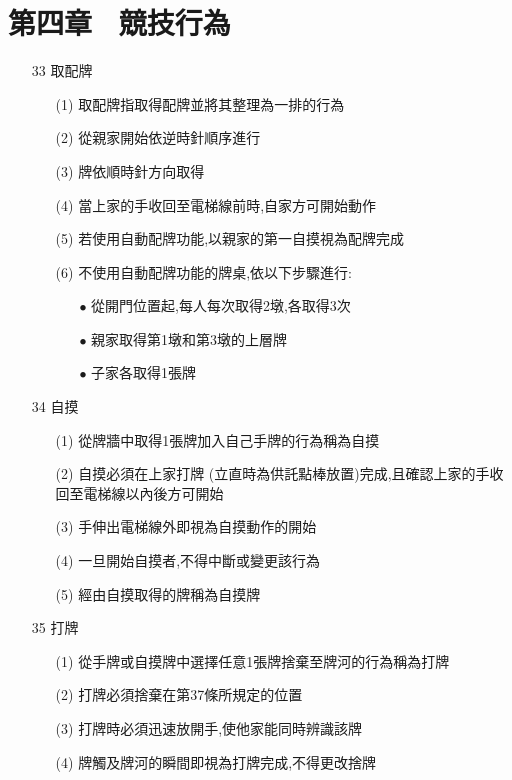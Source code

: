 \documentclass[a4paper,12pt]{article}
\begin{document}
\section*{第四章 \ 競技行為}
\begin{itemize}
    \item[33] 取配牌
    \begin{itemize}
        \item[(1)] 取配牌指取得配牌並將其整理為一排的行為
        \item[(2)] 從親家開始依逆時針順序進行
        \item[(3)] 牌依順時針方向取得
        \item[(4)] 當上家的手收回至電梯線前時,自家方可開始動作
        \item[(5)] 若使用自動配牌功能,以親家的第一自摸視為配牌完成
        \item[(6)] 不使用自動配牌功能的牌桌,依以下步驟進行:
        \begin{itemize}
            \item[$\bullet$] 從開門位置起,每人每次取得2墩,各取得3次
            \item[$\bullet$] 親家取得第1墩和第3墩的上層牌
            \item[$\bullet$] 子家各取得1張牌
        \end{itemize}
    \end{itemize}
    \item[34] 自摸
    \begin{itemize}
        \item[(1)] 從牌牆中取得1張牌加入自己手牌的行為稱為自摸
        \item[(2)] 自摸必須在上家打牌 (立直時為供託點棒放置)完成,且確認上家的手收回至電梯線以內後方可開始
        \item[(3)] 手伸出電梯線外即視為自摸動作的開始
        \item[(4)] 一旦開始自摸者,不得中斷或變更該行為
        \item[(5)] 經由自摸取得的牌稱為自摸牌
    \end{itemize}
    \item[35] 打牌
    \begin{itemize}
        \item[(1)] 從手牌或自摸牌中選擇任意1張牌捨棄至牌河的行為稱為打牌
        \item[(2)] 打牌必須捨棄在第37條所規定的位置
        \item[(3)] 打牌時必須迅速放開手,使他家能同時辨識該牌
        \item[(4)] 牌觸及牌河的瞬間即視為打牌完成,不得更改捨牌

\end{itemize}
\end{itemize}
\end{document}
